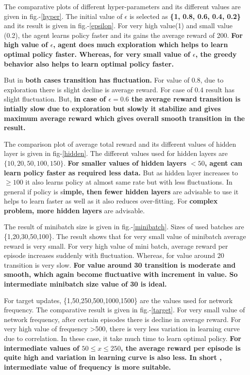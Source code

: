 \documentclass[preprint,12pt]{elsarticle}
\begin{document}
	 The comparative plots of different hyper-parameters and its different values are given in fig.-\ref{hyper}. The initial value of $\epsilon$ is selected as \textbf{\{1, 0.8, 0.6, 0.4, 0.2\}} and its result is given in fig.-\ref{epsilon}. For very high value(1) and small value (0.2), the agent learns policy faster and its gains the average reward of 200. \textbf{For high value of $\epsilon$, agent does much exploration which helps to learn optimal policy faster. Whereas, for very small value of $\epsilon$, the greedy behavior also helps to learn optimal policy faster.}
	 
	  But in\textbf{ both cases transition has fluctuation.} For value of 0.8, due to exploration there is slight decline is average reward. For case of 0.4 result has slight fluctuation. But, \textbf{in case of $\epsilon = 0.6$ the average reward transition is intially slow due to exploration but slowly it stabilize and gives maximum average reward which gives overall smooth transition in the result.}
	  
	  The comparison plot of average total reward and its different values of hidden layer is given in fig-\ref{hidden}. The different values used for hidden layers are $\{10,20,50,100,150\}$. \textbf{For smaller values of hidden layers $<50$, agent can learn policy faster as required less data.}  But as hidden layer increases to $\ge 100$ it also learns  policy at almost same rate but with less fluctuations. In general if policy is s\textbf{imple, then fewer hidden layers} are advisable to use it helps to learn faster as well as it also reduces over-fitting. For \textbf{complex problem, more hidden layers} are advisable.
	  
	  The result of minibatch size is given in fig.-\ref{minibatch}. Sizes of used batches are \{1,20,30,50,100\}. The result shows that for very small value of minibatch average reward is very small. For very high value of mini batch, average reward per episode increases suddenly with fluctuation. Whereas, for value around 20 transition is very slow. \textbf{For value around 30 transition is moderate and smooth, which again become fluctuative with increment in value. So intermediate minibatch size value of 30 is ideal.} 
	  
	  For target updates, \{1,50,250,500,1000,1500\} are the values used for network frequency. The comparative result is given in fig.-\ref{target}.  For very small value of network frequency, after certain episodes there is decline in average reward. For very high value of frequency >500, there is very less variation in learning curve due to correlation. In these case, it take much time to learn optimal policy. \textbf{For intermediate values of $50\le x \le 250$, the average reward per episode is quite high and variation in learning curve is also less. In short , intermediate value of frequency is more suitable.}
	  
\end{document}
